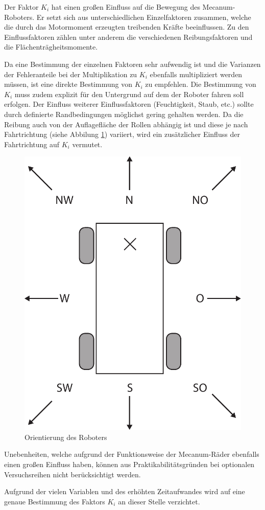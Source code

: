 Der Faktor $K_i$ hat einen großen Einfluss auf die Bewegung des Mecanum-Roboters. Er setzt sich aus unterschiedlichen Einzelfaktoren zusammen, welche die durch das Motormoment erzeugten treibenden Kräfte beeinflussen. Zu den Einflussfaktoren zählen unter anderem die verschiedenen Reibungsfaktoren und die Flächenträgheitsmomente. 

Da eine Bestimmung der einzelnen Faktoren sehr aufwendig ist und die Varianzen der Fehleranteile  bei der Multiplikation zu $K_i$ ebenfalls multipliziert werden müssen, ist eine direkte Bestimmung von $K_i$ zu empfehlen. Die Bestimmung von  $K_i$ muss zudem explizit für den Untergrund auf dem der Roboter fahren soll erfolgen. Der Einfluss weiterer Einflussfaktoren (Feuchtigkeit, Staub, etc.) sollte durch definierte Randbedingungen möglichst gering gehalten werden. 
Da die Reibung auch von der Auflagefläche der Rollen abhängig ist und diese je nach Fahrtrichtung (siehe Abbilung \ref{fig:himmel}) variiert, wird ein zusätzlicher Einfluss der Fahrtrichtung auf  $K_i$ vermutet. 

\begin{figure}[H]
    \centering
    \includegraphics[width=.4\textwidth]{Abbildungen/Himmelsrichtungen}
    \caption{Orientierung des Roboters}
    \label{fig:himmel}
  \end {figure}

Unebenheiten, welche aufgrund der Funktionsweise der Mecanum-Räder ebenfalls einen großen Einfluss haben, können aus Praktikabilitätsgründen bei optionalen Versuchsreihen nicht berücksichtigt werden. 

Aufgrund der vielen Variablen und des erhöhten Zeitaufwandes wird auf eine genaue Bestimmung des Faktors $K_i$ an dieser Stelle verzichtet. 












